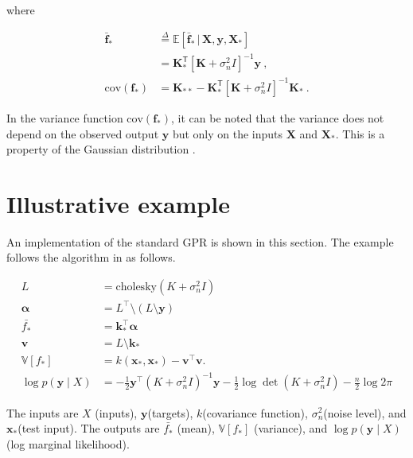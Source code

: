 \documentclass[preprint,12pt]{elsarticle}
\begin{document}
where 
\begin{ceqn}
    \begin{align}
        \mathbf{\bar{f}_*} &\overset{\Delta}{=} \mathbb{E} [\mathbf{\bar{f}_*} \, \vert \, \mathbf{X}, \mathbf{y}, \mathbf{X}_*] \nonumber\\ &= \mathbf{K}_*^\mathsf{T} [\mathbf{K} + \sigma_n^2{I}]^{-1} \mathbf{y} \ , \nonumber \\
        \text{cov}(\mathbf{f}_*) &= \mathbf{K}_{**} - \mathbf{K}_*^\mathsf{T} [\mathbf{K} + \sigma_n^2{I}]^{-1} \mathbf{K}_* \ . \nonumber
    \end{align}
\end{ceqn}
In the variance function $\text{cov}(\mathbf{f}_*)$, it can be noted that the variance does not depend on the observed output $\mathbf{y}$ but only on the inputs $\mathbf{X}$ and $\mathbf{X}_*$. This is a property of the Gaussian distribution \cite{Rasmussen2006}. 

\section{Illustrative example}

An implementation of the standard GPR is shown in this section. The example follows the algorithm in \cite{Rasmussen2006} as follows. 

\begin{ceqn}
    \begin{equation}\label{eqn:Marginals-and-conditionals-of-an-MVN}
      \boxed{\begin{split}
        L &= \text{cholesky}(K + \sigma^2_n I) \\
        \boldsymbol{\alpha} &= L^{\top} \setminus (L \setminus \mathbf{y}) \\
    	\bar{f_{*}} &= \mathbf{k}_{*}^{\top} \boldsymbol{\alpha} \\
    	\mathbf{v} &= L \setminus \mathbf{k}_{*} \\
    	\mathbb{V}[f_{*}] &= k(\mathbf{x}_{*}, \mathbf{x}_{*}) - \mathbf{v}^{\top} \mathbf{v}.\\ 
    	\log p(\mathbf{y} \mid X) &= -\frac{1}{2} \mathbf{y}^{\top} (K + \sigma_n^2 I)^{-1} \mathbf{y} - \frac{1}{2} \log \det(K + \sigma_n^2 I) - \frac{n}{2} \log 2 \pi \nonumber 
      \end{split}}
    \end{equation}
\end{ceqn}
The inputs are $X$ (inputs), $\mathbf{y}$(targets), $k$(covariance function), $\sigma^2_n$(noise level), and $\mathbf{x_{*}}$(test input). The outputs are $\bar{f_{*}}$ (mean), $\mathbb{V}[f_{*}]$ (variance), and $\log p(\mathbf{y} \mid X)$ (log marginal likelihood). 
\end{document}
